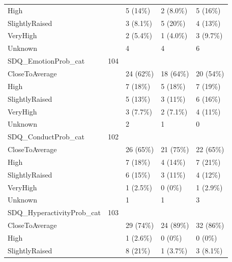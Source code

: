 \documentclass[
]{article}
\begin{document}
\begin{table}[!h]
\begin{tabular}[t]{lllll}
\hspace{1em}High &  & 5 (14\%) & 2 (8.0\%) & 5 (16\%)\\
\addlinespace
\hspace{1em}SlightlyRaised &  & 3 (8.1\%) & 5 (20\%) & 4 (13\%)\\
\hspace{1em}VeryHigh &  & 2 (5.4\%) & 1 (4.0\%) & 3 (9.7\%)\\
\hspace{1em}Unknown &  & 4 & 4 & 6\\
SDQ\_EmotionProb\_cat & 104 &  &  & \\
\hspace{1em}CloseToAverage &  & 24 (62\%) & 18 (64\%) & 20 (54\%)\\
\addlinespace
\hspace{1em}High &  & 7 (18\%) & 5 (18\%) & 7 (19\%)\\
\hspace{1em}SlightlyRaised &  & 5 (13\%) & 3 (11\%) & 6 (16\%)\\
\hspace{1em}VeryHigh &  & 3 (7.7\%) & 2 (7.1\%) & 4 (11\%)\\
\hspace{1em}Unknown &  & 2 & 1 & 0\\
SDQ\_ConductProb\_cat & 102 &  &  & \\
\addlinespace
\hspace{1em}CloseToAverage &  & 26 (65\%) & 21 (75\%) & 22 (65\%)\\
\hspace{1em}High &  & 7 (18\%) & 4 (14\%) & 7 (21\%)\\
\hspace{1em}SlightlyRaised &  & 6 (15\%) & 3 (11\%) & 4 (12\%)\\
\hspace{1em}VeryHigh &  & 1 (2.5\%) & 0 (0\%) & 1 (2.9\%)\\
\hspace{1em}Unknown &  & 1 & 1 & 3\\
\addlinespace
SDQ\_HyperactivityProb\_cat & 103 &  &  & \\
\hspace{1em}CloseToAverage &  & 29 (74\%) & 24 (89\%) & 32 (86\%)\\
\hspace{1em}High &  & 1 (2.6\%) & 0 (0\%) & 0 (0\%)\\
\hspace{1em}SlightlyRaised &  & 8 (21\%) & 1 (3.7\%) & 3 (8.1\%)\\

\end{tabular}
\end{table}
\end{document}
